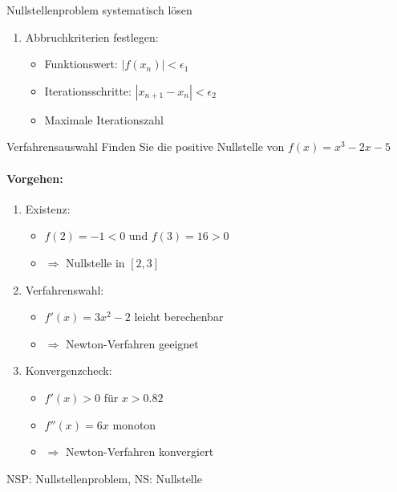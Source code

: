 \begin{KR}{Nullstellenproblem systematisch lösen}
\begin{enumerate}
    \item Abbruchkriterien festlegen:
    \begin{itemize}
        \item Funktionswert: $|f(x_n)| < \epsilon_1$
        \item Iterationsschritte: $|x_{n+1}-x_n| < \epsilon_2$
        \item Maximale Iterationszahl
    \end{itemize}
\end{enumerate}
\end{KR}

\begin{example2}{Verfahrensauswahl}
Finden Sie die positive Nullstelle von $f(x) = x^3 - 2x - 5$

\paragraph{Vorgehen:}
\begin{enumerate}
    \item Existenz:
    \begin{itemize}
        \item $f(2) = -1 < 0$ und $f(3) = 16 > 0$
        \item $\Rightarrow$ Nullstelle in $[2,3]$
    \end{itemize}
    
    \item Verfahrenswahl:
    \begin{itemize}
        \item $f'(x) = 3x^2 - 2$ leicht berechenbar
        \item $\Rightarrow$ Newton-Verfahren geeignet
    \end{itemize}
    
    \item Konvergenzcheck:
    \begin{itemize}
        \item $f'(x) > 0$ für $x > 0.82$
        \item $f''(x) = 6x$ monoton
        \item $\Rightarrow$ Newton-Verfahren konvergiert
    \end{itemize}
\end{enumerate}
\end{example2}

\begin{remark}
    NSP: Nullstellenproblem, NS: Nullstelle
\end{remark}

